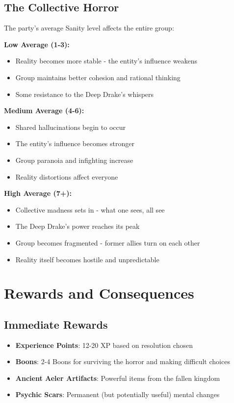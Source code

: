 \documentclass[11pt]{article}
\begin{document}
\subsection{The Collective Horror}

The party's average Sanity level affects the entire group:

\textbf{Low Average (1-3):} 
\begin{itemize}
\item Reality becomes more stable - the entity's influence weakens
\item Group maintains better cohesion and rational thinking
\item Some resistance to the Deep Drake's whispers
\end{itemize}

\textbf{Medium Average (4-6):}
\begin{itemize}
\item Shared hallucinations begin to occur
\item The entity's influence becomes stronger
\item Group paranoia and infighting increase
\item Reality distortions affect everyone
\end{itemize}

\textbf{High Average (7+):}
\begin{itemize}
\item Collective madness sets in - what one sees, all see
\item The Deep Drake's power reaches its peak
\item Group becomes fragmented - former allies turn on each other
\item Reality itself becomes hostile and unpredictable
\end{itemize}

\section{Rewards and Consequences}

\subsection{Immediate Rewards}

\begin{itemize}
\item \textbf{Experience Points}: 12-20 XP based on resolution chosen
\item \textbf{Boons}: 2-4 Boons for surviving the horror and making difficult choices
\item \textbf{Ancient Aeler Artifacts}: Powerful items from the fallen kingdom
\item \textbf{Psychic Scars}: Permanent (but potentially useful) mental changes
\end{itemize}
\end{document}
